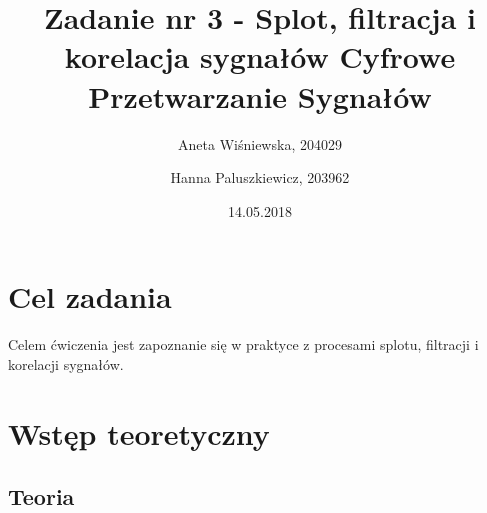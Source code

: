\documentclass[12pt]{article}
\title{{\bf Zadanie nr 3 - Splot, filtracja i korelacja sygnałów}\linebreak
Cyfrowe Przetwarzanie Sygnałów}
\author{Aneta Wiśniewska, 204029 \and Hanna Paluszkiewicz, 203962}
\date{14.05.2018}
\begin{document}
\clearpage\maketitle
\thispagestyle{empty}
\newpage
\setcounter{page}{1}
\section{Cel zadania}

Celem ćwiczenia jest zapoznanie się w praktyce z procesami splotu, filtracji i korelacji sygnałów.

\section{Wstęp teoretyczny}

\subsection{Teoria}


\end{document}
